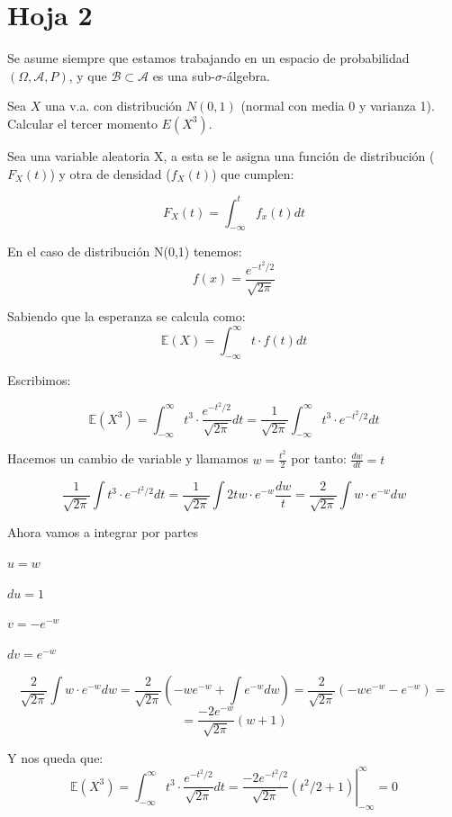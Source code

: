 \newpage
\section{Hoja 2}

Se asume siempre que estamos trabajando en un espacio de probabilidad $(\Omega, \mathcal{A}, P)$,
y que  $\mathcal{B}\subset \mathcal{A}$ es una sub-$\sigma$-\'algebra.


\begin{problem}[1]Sea $X$ una v.a. con distribuci\'on $N(0,1)$ (normal con media 0 y varianza 1). 
Calcular el tercer momento $E(X^3)$.
\solution

\begin{expla}
Sea una variable aleatoria X, a esta se le asigna una función de distribución ($F_X(t)$) y otra de densidad ($f_X(t)$) que cumplen:

\[
F_X(t)=\int_{-\infty}^{t}f_x(t)dt
\]

En el caso de distribución N(0,1) tenemos:
\[
f(x)=\frac{e^{-t^2/2}}{\sqrt{2\pi}}
\]

Sabiendo que la esperanza se calcula como:
\[
\mathbb{E}(X)=\int_{-\infty}^{\infty}t\cdot f(t)dt
\]

Escribimos:
\end{expla}

\[
\mathbb{E}(X^3)=\int_{-\infty}^{\infty}t^3\cdot \frac{e^{-t^2/2}}{\sqrt{2\pi}}dt = \frac{1}{\sqrt{2\pi}}\int_{-\infty}^{\infty}t^3\cdot e^{-t^2/2}dt
\]

Hacemos un cambio de variable y llamamos $w=\frac{t^2}{2}$ por tanto: $\frac{dw}{dt}=t$

\[
\frac{1}{\sqrt{2\pi}}\int t^3\cdot e^{-t^2/2}dt = \frac{1}{\sqrt{2\pi}}\int 2tw\cdot e^{-w}\frac{dw}{t} = \frac{2}{\sqrt{2\pi}}\int w\cdot e^{-w}dw
\]

Ahora vamos a integrar por partes

$u=w$

$du=1$

$v=-e^{-w}$

$dv=e^{-w}$

\[
\frac{2}{\sqrt{2\pi}}\int w\cdot e^{-w}dw = \frac{2}{\sqrt{2\pi}}\left( -we^{-w}+\int e^{-w}dw \right) =\frac{2}{\sqrt{2\pi}}\left( -we^{-w}-e^{-w} \right)=
\]
\[
= \frac{-2e^{-w}}{\sqrt{2\pi}}(w+1)
\]

Y nos queda que:
\[
\mathbb{E}(X^3)=\int_{-\infty}^{\infty}t^3\cdot \frac{e^{-t^2/2}}{\sqrt{2\pi}}dt = \left.\frac{-2e^{-t^2/2}}{\sqrt{2\pi}}(t^2/2+1)\right|_{-\infty}^{\infty}=0
\]




\end{problem}


